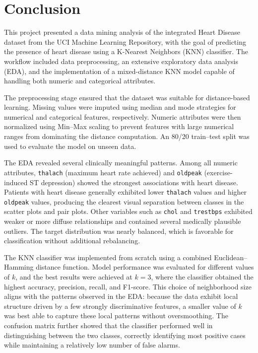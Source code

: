\section{Conclusion}

This project presented a data mining analysis of the integrated Heart Disease dataset from the UCI
Machine Learning Repository, with the goal of predicting the presence of heart disease using a
K-Nearest Neighbors (KNN) classifier. The workflow included data preprocessing, an extensive exploratory
data analysis (EDA), and the implementation of a mixed-distance KNN model capable of handling both
numeric and categorical attributes.

The preprocessing stage ensured that the dataset was suitable for distance-based learning. Missing values
were imputed using median and mode strategies for numerical and categorical features, respectively.
Numeric attributes were then normalized using Min--Max scaling to prevent features with large numerical
ranges from dominating the distance computation. An 80/20 train–test split was used to evaluate the model
on unseen data.

The EDA revealed several clinically meaningful patterns. Among all numeric attributes, \texttt{thalach}
(maximum heart rate achieved) and \texttt{oldpeak} (exercise-induced ST depression) showed the strongest
associations with heart disease. Patients with heart disease generally exhibited lower \texttt{thalach}
values and higher \texttt{oldpeak} values, producing the clearest visual separation between classes in the
scatter plots and pair plots. Other variables such as \texttt{chol} and \texttt{trestbps} exhibited weaker
or more diffuse relationships and contained several medically plausible outliers. The target distribution
was nearly balanced, which is favorable for classification without additional rebalancing.

The KNN classifier was implemented from scratch using a combined Euclidean–Hamming distance function.
Model performance was evaluated for different values of $k$, and the best results were achieved at
$k = 3$, where the classifier obtained the highest accuracy, precision, recall, and F1-score.
This choice of neighborhood size aligns with the patterns observed in the EDA: because the data exhibit
local structure driven by a few strongly discriminative features, a smaller value of $k$ was best able to
capture these local patterns without oversmoothing. The confusion matrix further showed that the classifier
performed well in distinguishing between the two classes, correctly identifying most positive cases while
maintaining a relatively low number of false alarms.

